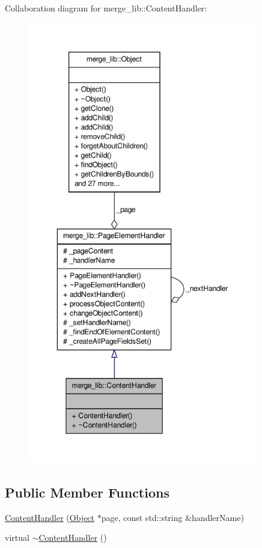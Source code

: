 Collaboration diagram for merge\-\_\-lib\-:\-:Content\-Handler\-:
\nopagebreak
\begin{figure}[H]
\begin{center}
\leavevmode
\includegraphics[height=550pt]{d8/de9/classmerge__lib_1_1_content_handler__coll__graph}
\end{center}
\end{figure}
\subsection*{Public Member Functions}
\begin{DoxyCompactItemize}
\item 
\hyperlink{classmerge__lib_1_1_content_handler_ada93140b4ab9453551c7c65c49bf956b}{Content\-Handler} (\hyperlink{classmerge__lib_1_1_object}{Object} $\ast$page, const std\-::string \&handler\-Name)
\item 
virtual \hyperlink{classmerge__lib_1_1_content_handler_aefba8878cf5cf2c6f3011c22e5545923}{$\sim$\-Content\-Handler} ()
\end{DoxyCompactItemize}
